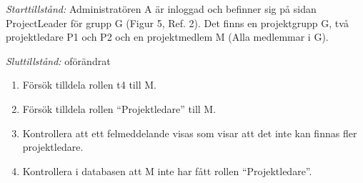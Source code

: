 \documentclass[a4paper]{article}
\begin{document}
\begin{FT}
\emph{Starttillstånd:} Administratören A är inloggad och befinner sig på sidan ProjectLeader för grupp G (Figur 5, Ref. 2). Det finns en projektgrupp G, två projektledare P1 och P2 och en projektmedlem M (Alla medlemmar i G).

\emph{Sluttillstånd:} oförändrat

\begin{enumerate}
\item Försök tilldela rollen t4 till M.
\item Försök tilldela rollen ``Projektledare'' till M.
\item Kontrollera att ett felmeddelande visas som visar att det inte kan finnas fler projektledare.
\item Kontrollera i databasen att M inte har fått rollen ``Projektledare''.
\end{enumerate}

%
%
%
\end{FT}

\end{document}
